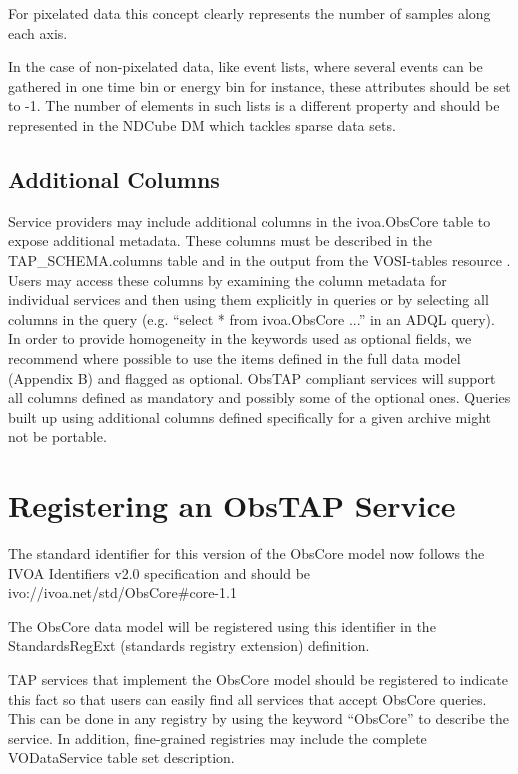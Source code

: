 \documentclass[11pt,a4paper]{ivoa}
\begin{document}
For pixelated data this concept clearly represents the number of samples along each axis.

In the case of non-pixelated data, like event lists, where several events can be gathered in one time bin or energy bin
for instance, these attributes should be set to -1. The number of elements in such lists is a different property and
should be represented in the NDCube DM which tackles sparse data sets.

\subsection{Additional Columns}
\label{bkm:Ref421295535}\label{bkm:Ref421297012}Service providers may include additional columns in the ivoa.ObsCore
table to expose additional metadata. These columns must be described in the TAP\_SCHEMA.columns table and in the output
from the VOSI-tables resource \citep{2011ivoa.spec.0531G}. Users may access these columns by examining the column
metadata for individual services and then using them explicitly in queries or by selecting all columns in the query
(e.g. ``select * from ivoa.ObsCore ...'' in an ADQL query).  In order to provide homogeneity in the keywords used as
optional fields, we recommend where possible to use the items defined in the full data model (Appendix B) and flagged
as optional. ObsTAP compliant services will support all columns defined as mandatory and possibly some of the optional
ones. Queries built up using additional columns defined specifically for a given archive might not be portable.

\section{Registering an ObsTAP Service}
\label{sec:obstap-register}The standard identifier for this version of the ObsCore model now follows the IVOA Identifiers
v2.0 specification \citep{2016ivoa.spec.0523D} and should be ivo://ivoa.net/std/ObsCore\#core-1.1

The ObsCore data model will be registered using this identifier in the StandardsRegExt (standards registry extension)
definition.

TAP services that implement the ObsCore model should be registered to indicate this fact so that users can easily find
all services that accept ObsCore queries. This can be done in any registry by using the keyword ``ObsCore'' to describe
the service. In addition, fine-grained registries may include the complete VODataService table set description.
\end{document}
